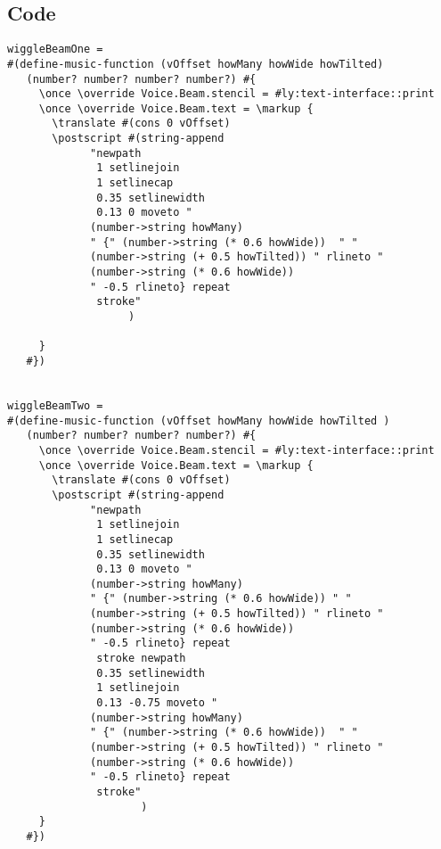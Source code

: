 \documentclass[11pt, oneside]{book}   	%
\begin{document}
\subsection{Code}
\begin{verbatim}
wiggleBeamOne =
#(define-music-function (vOffset howMany howWide howTilted)
   (number? number? number? number?) #{
     \once \override Voice.Beam.stencil = #ly:text-interface::print
     \once \override Voice.Beam.text = \markup {
       \translate #(cons 0 vOffset)
       \postscript #(string-append
             "newpath 
              1 setlinejoin 
              1 setlinecap 
              0.35 setlinewidth
              0.13 0 moveto "
             (number->string howMany)
             " {" (number->string (* 0.6 howWide))  " "
             (number->string (+ 0.5 howTilted)) " rlineto "
             (number->string (* 0.6 howWide))
             " -0.5 rlineto} repeat
              stroke"
                   )

     }
   #})


wiggleBeamTwo =
#(define-music-function (vOffset howMany howWide howTilted )
   (number? number? number? number?) #{
     \once \override Voice.Beam.stencil = #ly:text-interface::print
     \once \override Voice.Beam.text = \markup {
       \translate #(cons 0 vOffset)
       \postscript #(string-append
             "newpath 
              1 setlinejoin 
              1 setlinecap 
              0.35 setlinewidth 
              0.13 0 moveto "
             (number->string howMany)
             " {" (number->string (* 0.6 howWide)) " "
             (number->string (+ 0.5 howTilted)) " rlineto "
             (number->string (* 0.6 howWide))
             " -0.5 rlineto} repeat
              stroke newpath 
              0.35 setlinewidth 
              1 setlinejoin 
              0.13 -0.75 moveto "
             (number->string howMany)
             " {" (number->string (* 0.6 howWide))  " "
             (number->string (+ 0.5 howTilted)) " rlineto "
             (number->string (* 0.6 howWide))
             " -0.5 rlineto} repeat
              stroke"
                     )
     }
   #})



\end{verbatim}
\end{document}
